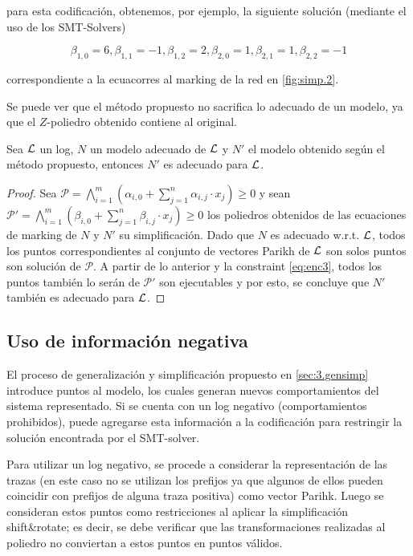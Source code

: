 para esta codificación, obtenemos, por ejemplo, la siguiente solución (mediante el uso de los SMT-Solvers)

$$\beta_{1,0}=6,\beta_{1,1}=-1,\beta_{1,2}=2, \beta_{2,0}=1,\beta_{2,1}=1,\beta_{2,2}=-1$$

correspondiente a la ecuacorres al marking de la red en \autoref{fig:simp.2}.

Se puede ver que el método propuesto no sacrifica lo adecuado de un modelo, ya que el $Z$-poliedro obtenido
contiene al original.

\begin{theorem}
    \label{theo:fit}
    Sea ${\mathcal L}$ un log, $N$ un modelo adecuado de ${\mathcal L}$ y $N'$ el modelo obtenido según el método propuesto,
    entonces $N'$ es adecuado para ${\mathcal L}$.
\end{theorem}

\begin{proof}
    Sea $\mathcal{P} = \bigwedge\limits_{i=1}^m (\alpha_{i,0} + \sum\limits_{j=1}^n \alpha_{i,j} \cdot x_j )\ge 0$ y sean
    $\mathcal{P}' = \bigwedge\limits_{i=1}^m (\beta_{i,0} + \sum\limits_{j=1}^n \beta_{i,j} \cdot x_j )\ge 0$ los poliedros
    obtenidos de las ecuaciones de marking de $N$ y $N'$ su simplificación. Dado que $N$ es adecuado w.r.t. ${\mathcal L}$, 
    todos los puntos correspondientes al conjunto de vectores Parikh de ${\mathcal L}$ son solos puntos son solución de 
    $\mathcal{P}$. A partir de lo anterior y la constraint \eqref{eq:enc3}, todos los puntos también lo serán de $\mathcal{P}'$
    son ejecutables y por esto, se concluye que $N'$ también es adecuado para ${\mathcal L}$.
\end{proof}


\subsection{Uso de información negativa}
\label{sec:3.gensimp negative}

El proceso de generalización y simplificación propuesto en \autoref{sec:3.gensimp} introduce puntos al modelo, 
los cuales generan nuevos comportamientos del sistema representado. Si se cuenta con un log negativo
(comportamientos prohibidos), puede agregarse esta información a la codificación para restringir la 
solución encontrada por el SMT-solver.

Para utilizar un log negativo, se procede a considerar la representación de las trazas (en este caso no se utilizan
los prefijos ya que algunos de ellos pueden coincidir con prefijos de alguna traza positiva) como vector Parihk.
Luego se consideran estos puntos como restricciones al aplicar la simplificación shift\&rotate; es decir, se debe 
verificar que las transformaciones realizadas al poliedro no conviertan a estos puntos en puntos válidos.

